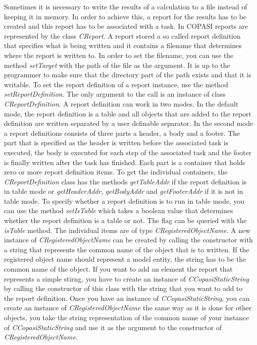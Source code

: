 \documentclass[a4,10pt]{article}
\begin{document}
Sometimes it is necessary to write the results of a calculation to a file instead of keeping it in memory. In order to achieve this, a report for the results has to be created and this report has to be associated with a task.
In COPASI reports are represented by the class \textit{CReport}. A report stored a so called report definition that specifies what is being written and it contains a filename that determines where the report is written to.
In order to set the filename, you can use the method \textit{setTarget} with the path of the file as the argument. It is up to the programmer to make sure that the directory part of the path exists and that it is writable.
To set the report definition of a report instance, use the method \textit{setReportDefinition}. The only argument to the call is an instance of class \textit{CReportDefinition}.
A report definition can work in two modes. In the default mode, the report definition is a table and all objects that are added to the report definition are written separated by a user definable separator.
In the second mode a report definitions consists of three parts a header, a body and a footer. The part that is specified as the header is written before the associated task is executed, the body is executed for each step of the associated task and the footer is finally written after the task has finished.
Each part is a container that holds zero or more report definition items. To get the individual containers, the \textit{CReportDefinition} class has the methods \textit{getTableAddr} if the report definition is in table mode or \textit{getHeaderAddr}, \textit{getBodyAddr} and \textit{getFooterAddr} if it is not in table mode.
To specify whether a report definition is to run in table mode, you can use the method \textit{setIsTable} which takes a boolean value that determines whether the report definition is a table or not. The flag can be queried with the \textit{isTable} method.
The individual items are of type \textit{CRegisteredObjectName}. A new instance of \textit{CRegisteredObjectName} can be created by calling the constructor with a string that represents the common name of the object that is to written.
If the registered object name should represent a model entity, the string has to be the common name of the object. If you want to add an element the report that represents a simple stirng, you have to create an instance of \textit{CCopasiStaticString} by calling the constructor of this class with the string that you want to add to the report definition. Once you have an instance of \textit{CCopasiStaticString}, you can create an instance of \textit{CRegisteredObjectName} the same way as it is done for other objects, you take the string representation of the common name of your instance of \textit{CCopasiStaticString} and use it as the argument to the constructor of \textit{CRegisteredObjectName}.
\end{document}
